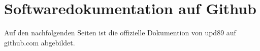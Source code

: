 \chapter{Softwaredokumentation auf Github}

Auf den nachfolgenden Seiten ist die offizielle Dokumention von upd89 auf github.com abgebildet.



